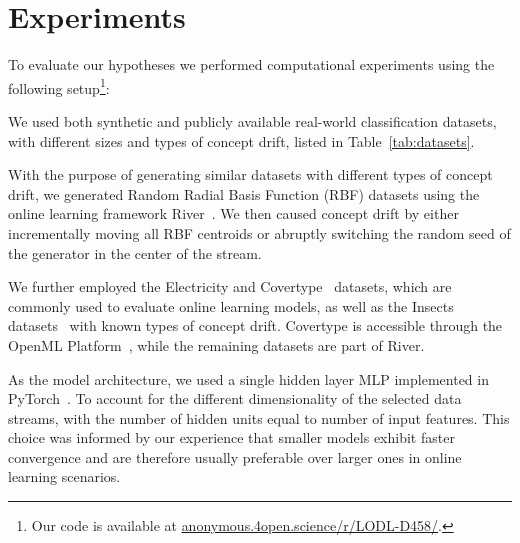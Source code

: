 \documentclass[letterpaper]{article} %
\begin{document}


\section{Experiments}\label{sec:experiments}

To evaluate our hypotheses we performed computational experiments using the following setup\footnote{Our code is available at \url{anonymous.4open.science/r/LODL-D458/}.}:

We used both synthetic and publicly available real-world classification datasets, with different sizes and types of concept drift, listed in Table~\ref{tab:datasets}.

With the purpose of generating similar datasets with different types of concept drift, we generated Random Radial Basis Function (RBF) datasets using the online learning framework River~\cite{montiel2021river}. We then caused concept drift by either incrementally moving all RBF centroids or abruptly switching the random seed of the generator in the center of the stream.

We further employed the Electricity and Covertype~\cite{misc_covertype_31} datasets, which are commonly used to evaluate online learning models, as well as the Insects datasets~\cite{souzaChallengesBenchmarkingStream2020} with known types of concept drift.
Covertype is accessible through the OpenML Platform~\cite{vanschorenOpenMLNetworkedScience2014}, while the remaining datasets are part of River.

As the model architecture, we used a single hidden layer MLP implemented in PyTorch~\cite{paszkePyTorchImperativeStyle2019}.
To account for the different dimensionality of the selected data streams, with the number of hidden units equal to number of input features.
This choice was informed by our experience that smaller models exhibit faster convergence and are therefore usually preferable over larger ones in online learning scenarios.
\end{document}
